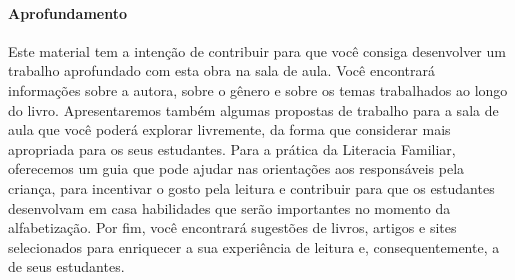 \documentclass[11pt]{extarticle}
\begin{document}

\paragraph{Aprofundamento} Este material tem a intenção de contribuir para que você consiga desenvolver um trabalho aprofundado com esta obra na sala de aula. Você encontrará informações sobre a autora, sobre o gênero e sobre os temas trabalhados ao longo do livro. Apresentaremos também algumas propostas de trabalho para a sala de aula que você poderá explorar livremente, da forma que considerar mais apropriada para os seus estudantes. Para a prática da Literacia Familiar, oferecemos um guia que pode ajudar nas orientações aos responsáveis pela criança, para incentivar o gosto pela leitura e contribuir para que os estudantes desenvolvam em casa habilidades que serão importantes no momento da alfabetização. Por fim, você encontrará sugestões de livros, artigos e sites selecionados para enriquecer a sua experiência de leitura e, consequentemente, a de seus estudantes.
\end{document}
